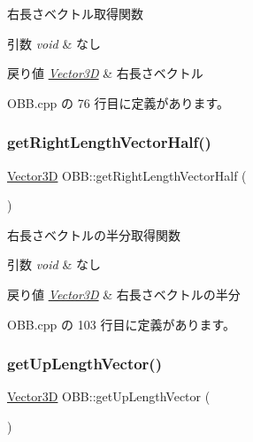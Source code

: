 右長さベクトル取得関数 


\begin{DoxyParams}{引数}
{\em void} & なし \\
\hline
\end{DoxyParams}

\begin{DoxyRetVals}{戻り値}
{\em \mbox{\hyperlink{class_vector3_d}{Vector3D}}} & 右長さベクトル \\
\hline
\end{DoxyRetVals}


 O\+B\+B.\+cpp の 76 行目に定義があります。

\mbox{\label{class_o_b_b_a9603eb8bafea12e725a99e1a0c5b8464}} 
\subsubsection{\texorpdfstring{get\+Right\+Length\+Vector\+Half()}{getRightLengthVectorHalf()}}
{\footnotesize\ttfamily \mbox{\hyperlink{class_vector3_d}{Vector3D}} O\+B\+B\+::get\+Right\+Length\+Vector\+Half (\begin{DoxyParamCaption}{ }\end{DoxyParamCaption})}



右長さベクトルの半分取得関数 


\begin{DoxyParams}{引数}
{\em void} & なし \\
\hline
\end{DoxyParams}

\begin{DoxyRetVals}{戻り値}
{\em \mbox{\hyperlink{class_vector3_d}{Vector3D}}} & 右長さベクトルの半分 \\
\hline
\end{DoxyRetVals}


 O\+B\+B.\+cpp の 103 行目に定義があります。

\mbox{\label{class_o_b_b_a9c08e8f3b799170efd244b4e700482c2}} 
\subsubsection{\texorpdfstring{get\+Up\+Length\+Vector()}{getUpLengthVector()}}
{\footnotesize\ttfamily \mbox{\hyperlink{class_vector3_d}{Vector3D}} O\+B\+B\+::get\+Up\+Length\+Vector (\begin{DoxyParamCaption}{ }\end{DoxyParamCaption})}



